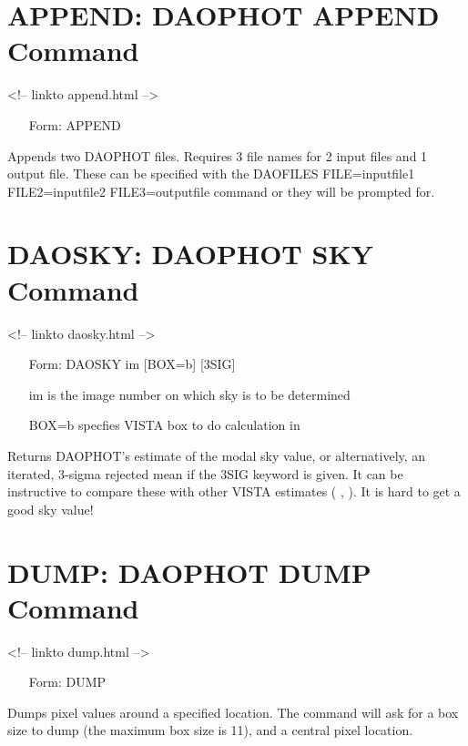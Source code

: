 \section{APPEND: DAOPHOT APPEND Command}
\begin{rawhtml}
<!-- linkto append.html -->
\end{rawhtml}
\begin{itemize}
  \item[Form: APPEND\hfill]{}
\end{itemize}

Appends two DAOPHOT files. Requires 3 file names for 2 input files and 1
output file. These can be specified with the DAOFILES FILE=inputfile1
FILE2=inputfile2 FILE3=outputfile command or they will be prompted for.

\section{DAOSKY: DAOPHOT SKY Command}
\begin{rawhtml}
<!-- linkto daosky.html -->
\end{rawhtml}
\begin{itemize}
  \item[Form: DAOSKY im {[BOX=b]} {[3SIG]}\hfill]{}
  \item[im]{is the image number on which sky is to be determined}
  \item[BOX=b]{specfies VISTA box to do calculation in}
\end{itemize}

Returns DAOPHOT's estimate of the modal sky value, or alternatively, an
iterated, 3-sigma rejected mean if the 3SIG keyword is given.  It can be
instructive to compare these
with other VISTA estimates (
, 
).  It is hard to get a good sky value!

\section{DUMP: DAOPHOT DUMP Command}
\begin{rawhtml}
<!-- linkto dump.html -->
\end{rawhtml}
\begin{itemize}
  \item[Form: DUMP\hfill]{}
\end{itemize}

Dumps pixel values around a specified location. The command will ask for a
box size to dump (the maximum box size is 11), and a central pixel
location.

